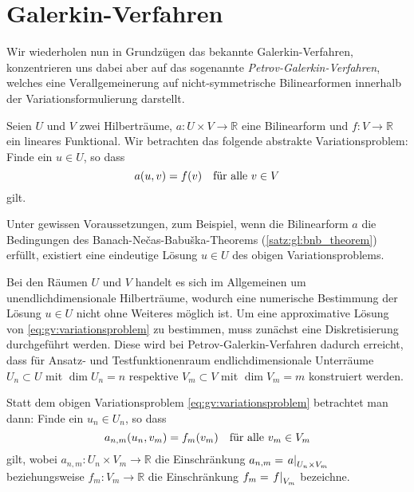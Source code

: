 

\section{Galerkin-Verfahren} %
\label{sec:galerkin_verfahren}


Wir wiederholen nun in Grundzügen das bekannte Galerkin-Verfahren, konzentrieren uns dabei aber auf das sogenannte \emph{Petrov-Galerkin-Verfahren}, welches eine Verallgemeinerung auf nicht-symmetrische Bilinearformen innerhalb der Variationsformulierung darstellt.

Seien $U$ und $V$ zwei Hilberträume, $a \colon U \times V \to \mathbb{R}$ eine Bilinearform und $f \colon V \to \mathbb{R}$ ein lineares Funktional.
Wir betrachten das folgende abstrakte Variationsproblem:
Finde ein $u \in U$, so dass
\begin{equation}
    \label{eq:gv:variationsproblem}
    a(u, v) = f(v) \quad \fa v \in V
\end{equation}
gilt.

Unter gewissen Voraussetzungen, zum Beispiel, wenn die Bilinearform $a$ die Bedingungen des Banach-Ne{\v c}as-Babu{\v s}ka-Theorems (\cref{satz:gl:bnb_theorem}) erfüllt, existiert eine eindeutige Lösung $u \in U$ des obigen Variationsproblems.

Bei den Räumen $U$ und $V$ handelt es sich im Allgemeinen um unendlichdimensionale Hilberträume, wodurch eine numerische Bestimmung der Lösung $u \in U$ nicht ohne Weiteres möglich ist.
Um eine approximative Lösung von \cref{eq:gv:variationsproblem} zu bestimmen, muss zunächst eine Diskretisierung durchgeführt werden.
Diese wird bei Petrov-Galerkin-Verfahren dadurch erreicht, dass für Ansatz- und Testfunktionenraum endlichdimensionale Unterräume $U_{n} \subset U$ mit $\dim U_{n} = n$ respektive $V_{m} \subset V$ mit $\dim V_{m} = m$ konstruiert werden.

Statt dem obigen Variationsproblem \cref{eq:gv:variationsproblem} betrachtet man dann:
Finde ein $u_{n} \in U_{n}$, so dass
\begin{equation}
    \label{eq:gv:variationsproblem_diskret}
    a_{n,m}(u_{n}, v_{m}) = f_{m}(v_{m}) \quad \fa v_{m} \in V_{m}
\end{equation}
gilt, wobei $a_{n, m} \colon U_{n} \times V_{m} \to \mathbb{R}$ die Einschränkung $a_{n,m} = \left.a\right|_{U_{n} \times V_{m}}$ beziehungsweise $f_{m} \colon V_{m} \to \mathbb{R}$ die Einschränkung $f_{m} = \left.f\right|_{V_{m}}$ bezeichne.


